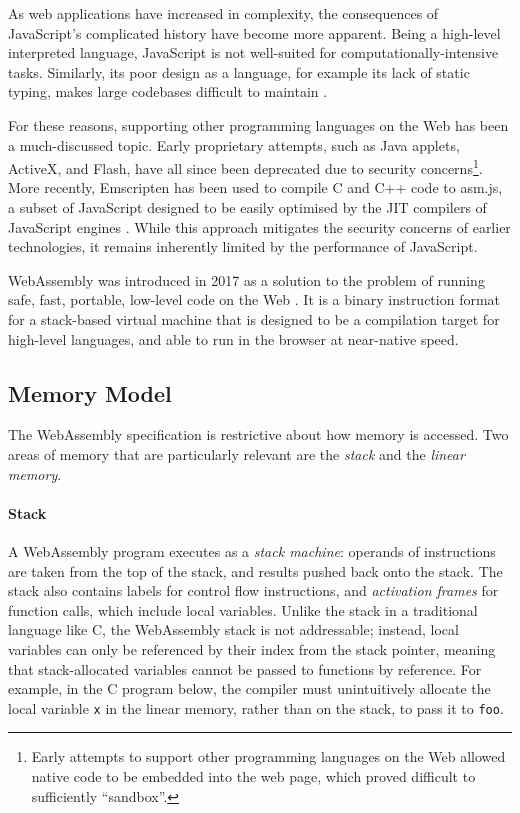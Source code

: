 As web applications have increased in complexity, the consequences of JavaScript's complicated history have become more apparent. Being a high-level interpreted language, JavaScript is not well-suited for computationally-intensive tasks. Similarly, its poor design as a language, for example its lack of static typing, makes large codebases difficult to maintain \cite{ocarizajr.JavaScriptErrorsWild2011, biermanUnderstandingTypeScript2014}.

For these reasons, supporting other programming languages on the Web has been a much-discussed topic. Early proprietary attempts, such as Java applets, ActiveX, and Flash, have all since been deprecated due to security concerns\footnote{Early attempts to support other programming languages on the Web allowed native code to be embedded into the web page, which proved difficult to sufficiently ``sandbox''.}. More recently, Emscripten has been used to compile C and C++ code to asm.js, a subset of JavaScript designed to be easily optimised by the JIT compilers of JavaScript engines \cite{zakaiEmscriptenLLVMtoJavaScriptcompiler2011}. While this approach mitigates the security concerns of earlier technologies, it remains inherently limited by the performance of JavaScript.

WebAssembly was introduced in 2017 as a solution to the problem of running safe, fast, portable, low-level code on the Web \cite{haasBringingwebspeed2017}. It is a binary instruction format for a stack-based virtual machine that is designed to be a compilation target for high-level languages, and able to run in the browser at near-native speed.

\newpage

\subsection{Memory Model}

\label{sec:wasm-memory-model}

The WebAssembly specification \cite{rossbergWebAssemblyCoreSpecification2022} is restrictive about how memory is accessed. Two areas of memory that are particularly relevant are the \emph{stack} and the \emph{linear memory}.

\paragraph{Stack}

A WebAssembly program executes as a \emph{stack machine}: operands of instructions are taken from the top of the stack, and results pushed back onto the stack. The stack also contains labels for control flow instructions, and \emph{activation frames} for function calls, which include local variables. Unlike the stack in a traditional language like C, the WebAssembly stack is not addressable; instead, local variables can only be referenced by their index from the stack pointer, meaning that stack-allocated variables cannot be passed to functions by reference. For example, in the C program below, the compiler must unintuitively allocate the local variable \texttt{x} in the linear memory, rather than on the stack, to pass it to \texttt{foo}.

